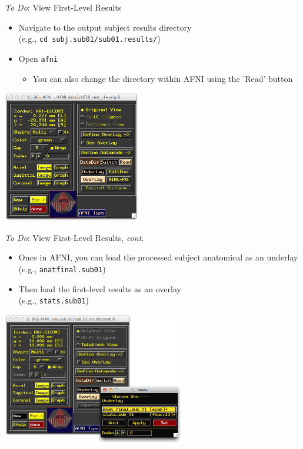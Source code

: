 \documentclass[t,12pt]{beamer}
\begin{document}
\begin{frame}{\emph{To Do}: View First-Level Results}
\vspace{10pt}
\begin{itemize}
\setlength\itemsep{1em}
\item Navigate to the output subject results directory \\ (e.g., \texttt{cd subj.sub\textunderscore{}01/sub\textunderscore{}01.results/})
\item Open \texttt{afni}
\vspace{4pt}
\begin{itemize}
\item You can also change the directory within AFNI using the 'Read' button
\end{itemize}
\end{itemize}
\vspace{4pt}
\centering
\includegraphics[width=0.45\textwidth]{images/afni_gui.png}
\end{frame}

\begin{frame}{\emph{To Do}: View First-Level Results, \textit{cont.}}
\vspace{10pt}
\begin{itemize}
\setlength\itemsep{1em}
\item Once in AFNI, you can load the processed subject anatomical as an underlay \\ (e.g., \texttt{anat\textunderscore{}final.sub\textunderscore{}01})
\item Then load the first-level results as an overlay \\ (e.g., \texttt{stats.sub\textunderscore{}01})
\end{itemize}
\vspace{4pt}
\centering
\includegraphics[width=0.6\textwidth]{images/select_underlay.png}
\end{frame}
\end{document}
